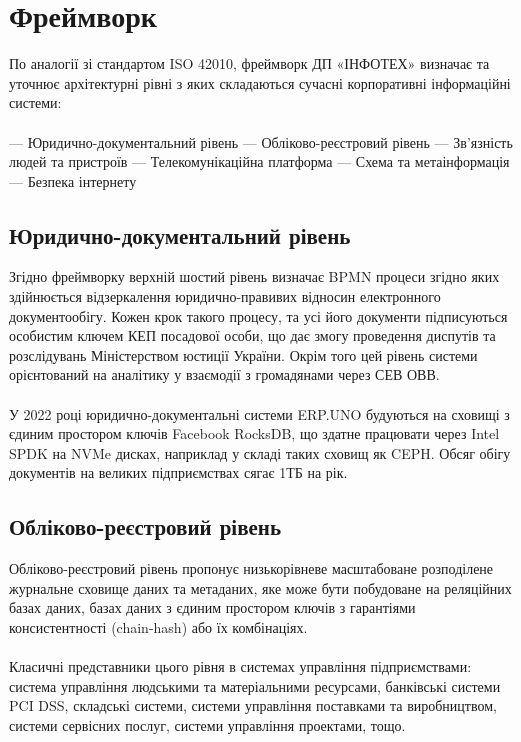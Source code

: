 \chapter{Фреймворк}

По аналогії зі стандартом ISO 42010, фреймворк ДП «ІНФОТЕХ» визначає та уточнює архітектурні рівні
з яких складаються сучасні корпоративні інформаційні системи:
\\
\\
--- Юридично-документальний рівень
--- Обліково-реєстровий рівень
--- Зв'язність людей та пристроїв
--- Телекомунікаційна платформа
--- Схема та метаінформація
--- Безпека інтернету

\section{Юридично-документальний рівень}

Згідно фреймворку верхній шостий рівень визначає BPMN процеси згідно яких здійнюється
відзеркалення юридично-правивих відносин електронного документообігу. Кожен крок такого
процесу, та усі його документи підписуються особистим ключем КЕП посадової особи, що дає
змогу проведення диспутів та розслідувань Міністерством юстиції України. Окрім того цей
рівень системи орієнтований на аналітику у взаємодії з громадянами через СЕВ ОВВ.
\\
\\
У 2022 році юридично-документальні системи ERP.UNO будуються на сховищі з єдиним
простором ключів Facebook RocksDB, що здатне працювати через Intel SPDK на NVMe
дисках, наприклад у складі таких сховищ як CEPH. Обсяг обігу документів на великих
підприємствах сягає 1ТБ на рік.

\section{Обліково-реєстровий рівень}

Обліково-реєстровий рівень пропонує низькорівневе масштабоване розподілене
журнальне сховище даних та метаданих, яке може бути побудоване на реляційних
базах даних, базах даних з єдиним простором ключів з гарантіями
консистентності (chain-hash) або їх комбінаціях.
\\
\\
Класичні представники цього рівня в системах управління підприємствами: система
управління людськими та матеріальними ресурсами, банківські системи PCI DSS,
складські системи, системи управління поставками та виробництвом, системи сервісних
послуг, системи управління проектами, тощо.

